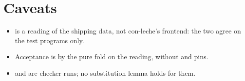 \section*{Caveats}
\begin{itemize}
\item {} is a reading of the shipping data, not con-leche's frontend: the two agree on the test programs only.
\item Acceptance is by the pure fold on the reading, without  and  pins.
\item {} and  are checker runs; no substitution lemma holds for them.
\end{itemize}
